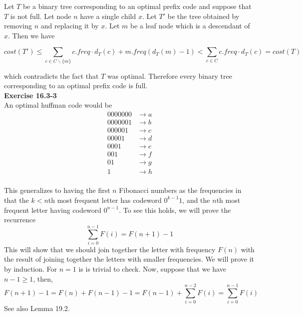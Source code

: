 \documentclass{article}
\begin{document}
Let $T$ be a binary tree corresponding to an optimal prefix code and suppose that $T$ is not full.  Let node $n$ have a single child $x$.  Let $T'$ be the tree obtained by removing $n$ and replacing it by $x$.  Let $m$ be a leaf node which is a descendant of $x$.  Then we have

\[ cost(T') \leq \sum_{c \in C \backslash \{m\} } c.freq \cdot d_{T}(c) + m.freq(d_T(m) - 1) < \sum_{c \in C} c.freq \cdot d_{T}(c) = cost(T)\]

which contradicts the fact that $T$ was optimal.  Therefore every binary tree corresponding to an optimal prefix code is full.\\


\noindent\textbf{Exercise 16.3-3}\\

An optimal huffman code would be 
\begin{align*}
0000000 &\rightarrow a\\
0000001 &\rightarrow b\\
000001 &\rightarrow c\\
00001 &\rightarrow d\\
0001 &\rightarrow e\\
001 &\rightarrow f\\
01 &\rightarrow g\\
1 &\rightarrow h\\
\end{align*}

This generalizes to having the first $n$ Fibonacci numbers as the frequencies in that the $k<n$th most frequent letter has codeword $0^{k-1}1$, and the $n$th most frequent letter having codeword $0^{n-1}$. To see this holds, we will prove the recurrence 
\[
\sum_{i=0}^{n-1} F(i) = F(n+1)-1
\]
This will show that we should join together the letter with frequency $F(n)$ with the result of joining together the letters with smaller frequencies. We will prove it by induction. For $n=1$ is is trivial to check. Now, suppose that we have $n-1\ge1$, then, 
\[
F(n+1) - 1 = F(n) + F(n-1) -1 = F(n-1) + \sum_{i=0}^{n-2} F(i) = \sum_{i=0}^{n-1} F(i)
\]
See also Lemma 19.2.
\end{document}
